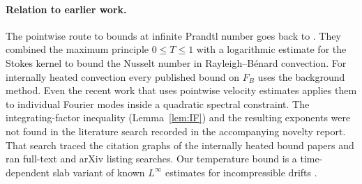 \paragraph{Relation to earlier work.} The pointwise route to bounds at infinite Prandtl number goes back to
\citet{ConstantinDoering1999}. They combined the maximum principle $0\le T\le1$ with a logarithmic estimate for
the Stokes kernel to bound the Nusselt number in Rayleigh--B\'enard convection. For internally heated
convection every published bound on $F_B$ uses the background method. Even the recent work that uses
pointwise velocity estimates \citep{Arslan2024rot} applies them to individual Fourier modes inside a quadratic
spectral constraint. The integrating-factor inequality (Lemma~\ref{lem:IF}) and the resulting exponents were
not found in the literature search recorded in the accompanying novelty report. That search traced the citation
graphs of the internally heated bound papers and ran full-text and arXiv listing searches. Our temperature
bound is a time-dependent slab variant of known $L^\infty$ estimates for incompressible drifts
\citep{BerestyckiEtAl2010,IyerEtAl2010}.
